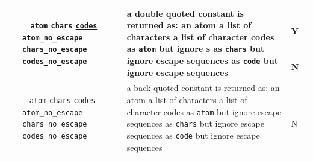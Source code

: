 \begin{tabular}{|L{4.5cm}|C{2.8cm}|L{6.2cm}|C{0,6cm}|}
~
\newline
{} &
  ~
\newline
  \texttt{atom}
\newline
  \texttt{chars}
\newline
  \texttt{\underline{codes}}
\newline
  \texttt{atom\_no\_escape}
\newline
  \texttt{chars\_no\_escape}
\newline
  \texttt{codes\_no\_escape} &
    a double quoted constant is returned as:
\newline
    an atom
\newline
    a list of characters
\newline
    a list of character codes
\newline
    as \texttt{atom} but ignore s
\newline
    as \texttt{chars} but ignore escape sequences
\newline
    as \texttt{code} but ignore escape sequences &
      ~
\newline
      Y
\newline
    ~
\newline
    ~
\newline
      N
 \\

\hline

~
\newline
{} &
  ~
\newline
  \texttt{atom}
\newline
  \texttt{chars}
\newline
  \texttt{codes}
\newline
  \texttt{\underline{atom\_no\_escape}}
\newline
  \texttt{chars\_no\_escape}
\newline
  \texttt{codes\_no\_escape} &
    a back quoted constant is returned as:
\newline
    an atom
\newline
    a list of characters
\newline
    a list of character codes
\newline
    as \texttt{atom} but ignore escape sequences
\newline
    as \texttt{chars} but ignore escape sequences
\newline
    as \texttt{code} but ignore escape sequences &
      ~
\newline
      N
 \\
\hline


\end{tabular}
